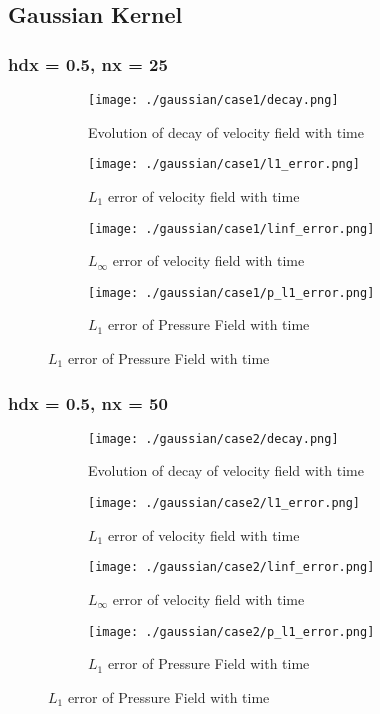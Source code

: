 \documentclass[11pt, a4paper]{article}
\begin{document}
\subsection{Gaussian Kernel}
\subsubsection{hdx = 0.5, nx = 25}
\begin{figure}[H]
\begin{subfigure}{0.48\textwidth}
\texttt{[image: ./gaussian/case1/decay.png]}
\caption{Evolution of decay of velocity field with time}
\end{subfigure}
\begin{subfigure}{0.48\textwidth}
\texttt{[image: ./gaussian/case1/l1\_error.png]}
\caption{$L_1$ error of velocity field with time}
\end{subfigure}
\medskip
\begin{subfigure}{0.48\textwidth}
\texttt{[image: ./gaussian/case1/linf\_error.png]}
\caption{$L_\infty$ error of velocity field with time}
\end{subfigure}
\begin{subfigure}{0.48\textwidth}
\texttt{[image: ./gaussian/case1/p\_l1\_error.png]}
\caption{$L_1$ error of Pressure Field with time}
\end{subfigure}
\end{figure}

\subsubsection{hdx = 0.5, nx = 50}
\begin{figure}[H]
\begin{subfigure}{0.48\textwidth}
\texttt{[image: ./gaussian/case2/decay.png]}
\caption{Evolution of decay of velocity field with time}
\end{subfigure}
\begin{subfigure}{0.48\textwidth}
\texttt{[image: ./gaussian/case2/l1\_error.png]}
\caption{$L_1$ error of velocity field with time}
\end{subfigure}
\medskip
\begin{subfigure}{0.48\textwidth}
\texttt{[image: ./gaussian/case2/linf\_error.png]}
\caption{$L_\infty$ error of velocity field with time}
\end{subfigure}
\begin{subfigure}{0.48\textwidth}
\texttt{[image: ./gaussian/case2/p\_l1\_error.png]}
\caption{$L_1$ error of Pressure Field with time}
\end{subfigure}
\end{figure}
\end{document}

